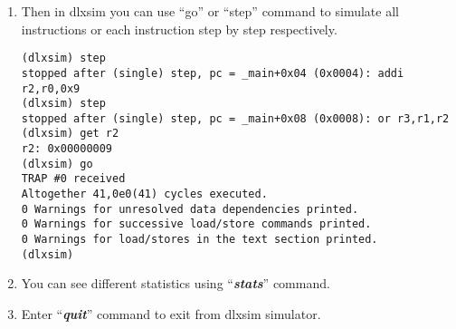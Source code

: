 \begin{enumerate}
\begin{lstlisting}
-----------------------------------------------
Starting dlxsim:
-----------------------------------------------
/Software/epp/dlxsim_Laboratory/dlxsim -fBUILD_SIM/Arith.dlxsim -f1_Arith.s -da0 -pf0
Biggest used address for Text Section (word aligned): 0x1c
Biggest used address for Data Section (word aligned): 0x0
(dlxsim)
\end{lstlisting}
	\item Then in dlxsim you can use ``go'' or ``step'' command to simulate all
	instructions or each instruction step by step respectively.
\begin{lstlisting}
(dlxsim) step
stopped after (single) step, pc = _main+0x04 (0x0004): addi r2,r0,0x9
(dlxsim) step
stopped after (single) step, pc = _main+0x08 (0x0008): or r3,r1,r2
(dlxsim) get r2
r2:	0x00000009
(dlxsim) go
TRAP #0 received
Altogether 41,0e0(41) cycles executed.
0 Warnings for unresolved data dependencies printed.
0 Warnings for successive load/store commands printed.
0 Warnings for load/stores in the text section printed.
(dlxsim) 
\end{lstlisting}
\item You can see different statistics using ``\emph{\textbf{stats}}''
	command.
\item Enter ``\emph{\textbf{quit}}'' command to exit from dlxsim simulator.
\end{enumerate}
